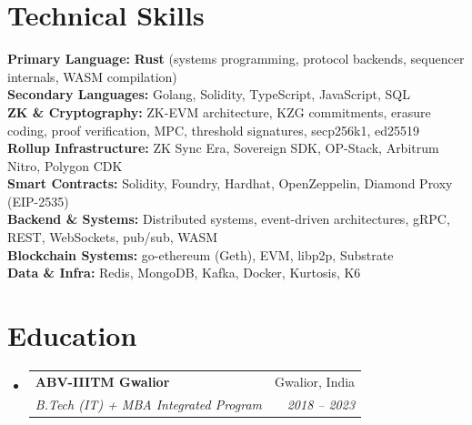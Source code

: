 \documentclass[letterpaper,11pt]{article}
\makeatletter
\newcommand{\resumeSubheading}[4]{
  \vspace{-2pt}\item
    \begin{tabular*}{0.97\textwidth}[t]{l@{\extracolsep{\fill}}r}
      \textbf{#1} & #2 \\
      \textit{\small#3} & \textit{\small #4} \\
    \end{tabular*}\vspace{-7pt}
}
\newcommand{\resumeSubHeadingListStart}{\begin{itemize}[leftmargin=0.15in, label={}]}
\newcommand{\resumeSubHeadingListEnd}{\end{itemize}}
\makeatother
\begin{document}
\section{Technical Skills}
\begin{itemize}[leftmargin=0.15in, label={}]
  \small{\item{
    \textbf{Primary Language:} \textbf{Rust} (systems programming, protocol backends, sequencer internals, WASM compilation) \\
    \textbf{Secondary Languages:} Golang, Solidity, TypeScript, JavaScript, SQL \\
    \textbf{ZK \& Cryptography:} ZK-EVM architecture, KZG commitments, erasure coding, proof verification, MPC, threshold signatures, secp256k1, ed25519 \\
    \textbf{Rollup Infrastructure:} ZK Sync Era, Sovereign SDK, OP-Stack, Arbitrum Nitro, Polygon CDK \\
    \textbf{Smart Contracts:} Solidity, Foundry, Hardhat, OpenZeppelin, Diamond Proxy (EIP-2535) \\
    \textbf{Backend \& Systems:} Distributed systems, event-driven architectures, gRPC, REST, WebSockets, pub/sub, WASM \\
    \textbf{Blockchain Systems:} go-ethereum (Geth), EVM, libp2p, Substrate \\
    \textbf{Data \& Infra:} Redis, MongoDB, Kafka, Docker, Kurtosis, K6
  }}
\end{itemize}

\section{Education}
\resumeSubHeadingListStart
  \resumeSubheading
    {ABV-IIITM Gwalior}{Gwalior, India}
    {B.Tech (IT) + MBA Integrated Program}{2018 -- 2023}
\resumeSubHeadingListEnd
\end{document}
